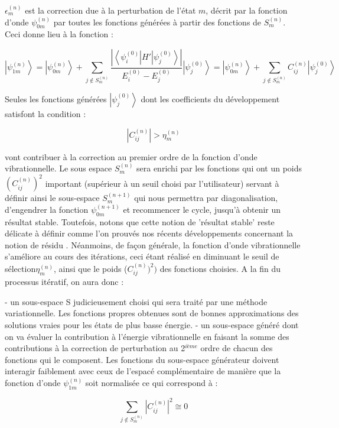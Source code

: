 $\epsilon^{(n)}_{m}$ est la correction due à la perturbation de l'état $m$, décrit par la fonction d'onde $\psi^{(n)}_{0m}$ par toutes les fonctions générées à partir des fonctions de $S^{(n)}_{m}$.
Ceci donne lieu à la fonction :


\begin{equation}
	\left| \psi^{(n)}_{1m} \right\rangle  =  \left| \psi^{(n)}_{0m} \right\rangle + \sum_{j \notin  S^{(n)}_{m}}  \frac{| \left\langle \psi^{(0)}_{i} \right| H' \left| \psi^{(0)}_{j} \right\rangle |} {E^{(0)}_{i} - E^{(0)}_{j}}  \left| \psi^{(0)}_{j} \right\rangle = \left| \psi^{(n)}_{0m} \right\rangle  + \sum_{j \notin  S^{(n)}_{m}} C_{ij}^{(n)} \left| \psi^{(0)}_{j} \right\rangle
\end{equation}

Seules les fonctions générées $\left \vert \psi^{(0)}_{j} \right \rangle$ dont les coefficients du développement satisfont la condition :


\begin{equation}
         \left| C_{ij}^{(n)} \right| > \eta^{(n)}_{m}
\end{equation}

vont contribuer à la correction au premier ordre de la fonction d'onde vibrationnelle. Le sous espace $S^{(n)}_{m}$ sera enrichi par les fonctions qui ont un poids $(C_{ij}^{(n)})^2$ important (supérieur à un seuil choisi par l'utilisateur) servant à définir ainsi le sous-espace $S^{(n+1)}_{m}$ qui nous permettra par diagonalisation, d'engendrer la fonction $\psi^{(n+1)}_{0m}$ et recommencer le cycle, jusqu'à obtenir un résultat stable. Toutefois, notons que cette notion de 'résultat stable' reste délicate à définir comme l'on prouvés nos récents développements concernant la notion de résidu \cite{garnier2016adaptive}. Néanmoins, de façon générale, la fonction d'onde vibrationnelle s'améliore au cours des itérations, ceci étant réalisé en diminuant le seuil de sélection$\eta^{(n)}_{m}$, ainsi que le poids ($C_{ij}^{(n)})^2)$ des fonctions choisies. A la fin du processus itératif, on aura donc :

- un sous-espace S judicieusement choisi qui sera traité par une méthode variationnelle. Les fonctions propres obtenues sont de bonnes approximations des solutions vraies pour les états de plus basse énergie.
- un sous-espace généré dont on va évaluer la contribution à l'énergie vibrationnelle en faisant la somme des contributions à la correction de perturbation au 2$^{ième}$ ordre de chacun des fonctions qui le composent. Les fonctions du sous-espace générateur doivent interagir faiblement avec ceux de l'espacé complémentaire de manière que la fonction d'onde $\psi^{(n)}_{1m}$ soit normalisée ce qui correspond à :

\begin{equation}
	 \sum_{j \notin  S^{(n)}_{m}}  \left| C_{ij}^{(n)} \right|^2  \cong 0
\end{equation}



 








